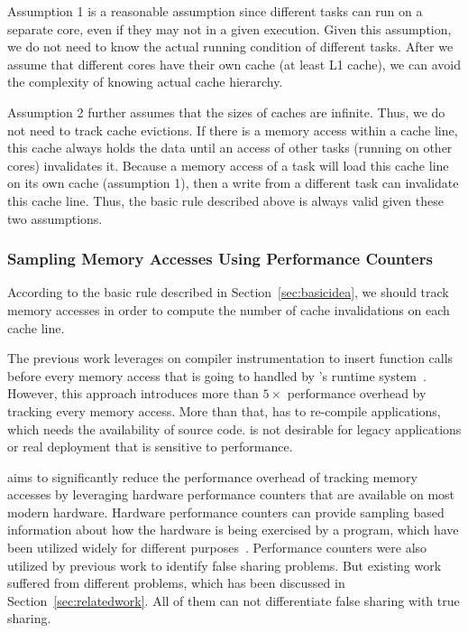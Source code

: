 Assumption 1 is a reasonable assumption since different tasks can run on a separate core, even if they may not in a given execution. Given this assumption, we do not need to know the actual running condition of different tasks. After we assume that different cores have their own cache (at least L1 cache), we can avoid the complexity of knowing actual cache hierarchy. 

Assumption 2 further assumes that the sizes of caches are infinite. Thus, we do not need to track cache evictions. If there is a memory access within a cache line, this cache always holds the data until an access of other tasks (running on other cores) invalidates it. Because a memory access of a task will load this cache line on its own cache (assumption 1), then a write from a different task can invalidate this cache line. Thus, the basic rule described above is always valid given these two assumptions.  

 


\subsubsection{Sampling Memory Accesses Using Performance Counters}
\label{sec:perfcounter}

According to the basic rule described in Section~\ref{sec:basicidea}, we should track memory accesses in order to compute the number of cache invalidations on each cache line. 


The previous work \Predator{} leverages on compiler instrumentation to insert function calls before every memory access that is going to handled by \Predator{}'s runtime system~\cite{Predator}. However, this approach introduces more than $5\times$ performance overhead by tracking every memory access. More than that, \Predator{} has to re-compile applications, which needs the availability of source code. \Predator{} is not desirable for legacy applications or real deployment that is sensitive to performance. 

\cheetah{} aims to significantly reduce the performance overhead of tracking memory accesses by leveraging hardware performance counters that are available on most modern hardware. Hardware performance counters can provide sampling based information about how the hardware is being exercised by a program, which have been utilized widely for different purposes~\cite{Mucci99papi}. Performance counters were also utilized by previous work to identify false sharing problems. But existing work suffered from different problems, which has been discussed in Section~\ref{sec:relatedwork}. All of them can not differentiate false sharing with true sharing. 
 
